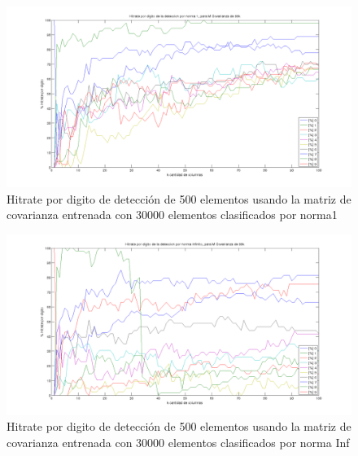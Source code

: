 \begin{figure}[H]
\begin {center}
\includegraphics[width=500pt]{plots/pordig-30kcv-norma1.png}
\end {center}
\caption{Hitrate por digito de detecci\'on de 500 elementos usando la matriz de covarianza entrenada con 30000 elementos
clasificados por norma1}
\label{fig:HRD30kcv-n1}
\end{figure}

\begin{figure}[H]
\begin {center}
\includegraphics[width=500pt]{plots/pordig-30kcv-normainf.png}
\end {center}
\caption{Hitrate por digito de detecci\'on de 500 elementos usando la matriz de covarianza entrenada con 30000 elementos
clasificados por norma Inf}
\label{fig:HRD30kcv-ninf}
\end{figure}

